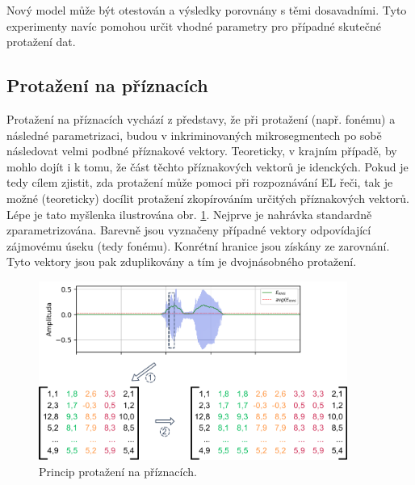 \noindent Nový model může být otestován a výsledky porovnány s těmi dosavadními. Tyto experimenty navíc pomohou určit vhodné parametry pro případné skutečné protažení dat.


\subsection{Protažení na příznacích}
\label{chap:realisation:augmentation:features}

Protažení na příznacích vychází z představy, že při protažení (např. fonému) a následné parametrizaci, budou v inkriminovaných mikrosegmentech po sobě následovat velmi podbné příznakové vektory.
Teoreticky, v krajním případě, by mohlo dojít i k tomu, že část těchto příznakových vektorů je idenckých. Pokud je tedy cílem zjistit, zda protažení může pomoci při rozpoznávání EL řeči, tak je možné (teoreticky) docílit protažení zkopírováním určitých příznakových vektorů.
Lépe je tato myšlenka ilustrována obr. \ref{fig:realisation:augmentation:features}. Nejprve je nahrávka standardně zparametrizována. Barevně jsou vyznačeny případné vektory odpovídající zájmovému úseku (tedy fonému). Konrétní hranice jsou získány ze zarovnání. Tyto vektory jsou pak zduplikovány a tím je  dvojnásobného protažení.

\begin{figure}[hbpt]
  \centering
  \includegraphics[width=0.9\textwidth]{./ch5-construction/img/augmentation_features.pdf}
  \caption{Princip protažení na příznacích.}
  \label{fig:realisation:augmentation:features}
\end{figure}

